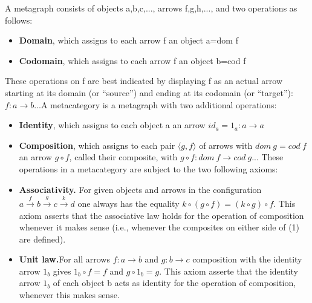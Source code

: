 \documentclass [12pt]{book}
\begin{document}
\begin{cat}A metagraph consists of objects a,b,c,..., arrows f,g,h,..., and two operations as follows:

\begin{itemize}\item[]\textbf{Domain}, which assigns to each arrow f an object a=dom f

\item[]\textbf{Codomain}, which assigns to each arrow f an object b=cod f\end{itemize}

These operations on f are best indicated by displaying f as an actual arrow starting at its domain (or ``source'') and ending at its codomain (or ``target''):$f:a\rightarrow b$...A metacategory is a metagraph with two additional operations:

\begin{itemize}\item[]\textbf{Identity}, which assigns to each object a an arrow $id_a=1_a:a\rightarrow a$

\item[]\textbf{Composition}, which assigns to each pair $\langle g,f\rangle$ of arrows with $dom~g= cod~f$ an arrow $g\circ f$, called their composite, with $g\circ f:dom~f\rightarrow cod~g$... These operations in a metacategory are subject to the two following axioms:\end{itemize}

\begin{itemize}\item[]\textbf{Associativity.} For given objects and arrows in the configuration $a\stackrel{f}\rightarrow b\stackrel{g}\rightarrow c\stackrel{k}\rightarrow d$ one always has the equality $k\circ(g\circ f)=(k\circ g)\circ f$. This axiom asserts that the associative law holds for the operation of composition whenever it makes sense (i.e., whenever the composites on either side of (1) are defined).

\item[]\textbf{Unit law.}For all arrows $f:a\rightarrow b$ and $g:b\rightarrow c$ composition with the identity arrow $1_b$ gives $1_b\circ f=f$ and $g\circ 1_b=g$. This axiom asserte that the identity arrow $1_b$ of each object b acts as identity for the operation of composition, whenever this makes sense.\end{itemize}\end{cat}
\end{document}
